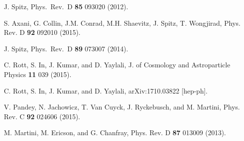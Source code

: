 \documentclass[
aps,
prl,
reprint,
showpacs,
]{revtex4-1}
\begin{document}
\begin{thebibliography}{9}

J. Spitz,  Phys.\ Rev.\  D {\bf 85} 093020 (2012).
 

S. Axani, G. Collin, J.M. Conrad, M.H. Shaevitz, J. Spitz, T. Wongjirad, Phys. Rev. D \textbf{92} 092010 (2015).

J. Spitz, Phys.\ Rev.\  D {\bf 89} 073007 (2014).

C. Rott, S. In, J. Kumar, and D. Yaylali, J. of Cosmology and Astroparticle Physics \textbf{11} 039 (2015).

C. Rott, S. In, J. Kumar, and D. Yaylali, arXiv:1710.03822 [hep-ph].

V. Pandey, N. Jachowicz, T. Van Cuyck, J. Ryckebusch, and M. Martini, Phys. Rev. C \textbf{92} 024606 (2015).

M. Martini, M. Ericson, and G. Chanfray, Phys. Rev. D \textbf{87} 013009 (2013).

\end{thebibliography}
\end{document}
